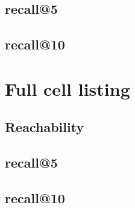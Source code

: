 \documentclass{article}
\begin{document}
\subsection{recall@5}


\subsection{recall@10}


\section{Full cell listing}

\subsection{Reachability}
{\scriptsize}

\subsection{recall@5}
{\scriptsize}

\subsection{recall@10}
{\scriptsize}
\end{document}
